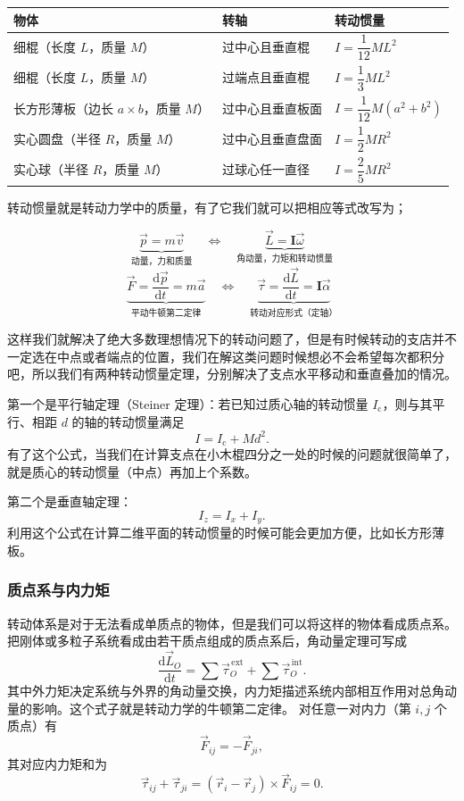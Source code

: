\documentclass[UTF8]{ctexbook}
\begin{document}
\begin{table}[htbp]
\centering
\renewcommand{\arraystretch}{1.5}
\begin{tabular*}{\textwidth}{@{\extracolsep{\fill}}lll}
\toprule
物体 & 转轴 & 转动惯量 \\
\midrule
细棍（长度 $L$，质量 $M$） & 过中心且垂直棍 & $I=\dfrac{1}{12}ML^2$ \\
细棍（长度 $L$，质量 $M$） & 过端点且垂直棍 & $I=\dfrac{1}{3}ML^2$ \\
长方形薄板（边长 $a\times b$，质量 $M$） & 过中心且垂直板面 & $I=\dfrac{1}{12}M(a^2+b^2)$ \\
实心圆盘（半径 $R$，质量 $M$） & 过中心且垂直盘面 & $I=\dfrac{1}{2}MR^2$ \\
实心球（半径 $R$，质量 $M$） & 过球心任一直径 & $I=\dfrac{2}{5}MR^2$ \\
\bottomrule
\end{tabular*}
\end{table}
转动惯量就是转动力学中的质量，有了它我们就可以把相应等式改写为；

\[
\underbrace{\vec{p}=m\vec{v}}_{\text{动量，力和质量}}
\quad\Longleftrightarrow\quad
\underbrace{\vec{L}=\mathbf I\vec{\omega}}_{\text{角动量，力矩和转动惯量}}
\]
\[
\underbrace{\vec{F}=\frac{\mathrm d\vec{p}}{\mathrm dt}=m\vec{a}}_{\text{平动牛顿第二定律}}
\quad\Longleftrightarrow\quad
\underbrace{\vec{\tau}=\frac{\mathrm d\vec{L}}{\mathrm dt}=\mathbf I\vec{\alpha}}_{\text{转动对应形式（定轴）}}
\]


这样我们就解决了绝大多数理想情况下的转动问题了，但是有时候转动的支店并不一定选在中点或者端点的位置，我们在解这类问题时候想必不会希望每次都积分吧，所以我们有两种转动惯量定理，分别解决了支点水平移动和垂直叠加的情况。

第一个是平行轴定理（Steiner 定理）：若已知过质心轴的转动惯量 \(I_{\mathrm{c}}\)，则与其平行、相距 \(d\) 的轴的转动惯量满足
\[
I=I_{\mathrm{c}}+Md^2.
\]
有了这个公式，当我们在计算支点在小木棍四分之一处的时候的问题就很简单了，就是质心的转动惯量（中点）再加上个系数。

第二个是垂直轴定理：
\[
I_z=I_x+I_y.
\]
利用这个公式在计算二维平面的转动惯量的时候可能会更加方便，比如长方形薄板。

\subsubsection{质点系与内力矩}

转动体系是对于无法看成单质点的物体，但是我们可以将这样的物体看成质点系。把刚体或多粒子系统看成由若干质点组成的质点系后，角动量定理可写成
\[
\frac{\mathrm d\vec{L}_O}{\mathrm dt}=\sum \vec{\tau}_O^{\,\text{ext}}+\sum \vec{\tau}_O^{\,\text{int}}.
\]
其中外力矩决定系统与外界的角动量交换，内力矩描述系统内部相互作用对总角动量的影响。这个式子就是转动力学的牛顿第二定律。
对任意一对内力（第 $i,j$ 个质点）有
\[
\vec{F}_{ij}=-\vec{F}_{ji},
\]
其对应内力矩和为
\[
\vec{\tau}_{ij}+\vec{\tau}_{ji}=(\vec{r}_i-\vec{r}_j)\times \vec{F}_{ij}=0.
\]
\end{document}
